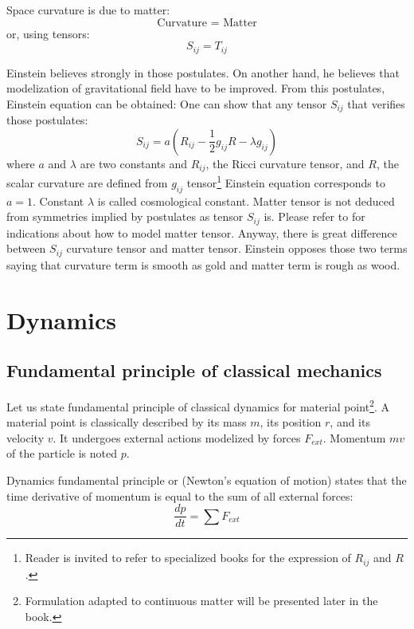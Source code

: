 \documentclass[12pt]{book}
\begin{document}
\begin{postulat}
Space curvature is due to matter:
\begin{equation}
\mbox{ Curvature }=\mbox{ Matter }
\end{equation}
or, using tensors:
\begin{equation}
S_{ij}=T_{ij}
\end{equation}
\end{postulat}
Einstein believes strongly in those postulates. On another hand, he believes
that modelization of gravitational field have to be improved.
From this postulates, Einstein equation can be obtained: One can show that any
tensor $S_{ij}$ that verifies those postulates:
\begin{equation}
S_{ij}=a(R_{ij}-\frac{1}{2}g_{ij}R-\lambda g_{ij})
\end{equation}
where $a$ and $\lambda$ are two constants and  $R_{ij}$, the Ricci
curvature tensor, and $R$, the scalar curvature are defined from $g_{ij}$
tensor\footnote{%
Reader is invited to refer to specialized books for the expression of
$R_{ij}$ and $R$.}%
Einstein equation corresponds to $a=1$. Constant $\lambda$ is called
cosmological constant. Matter tensor is not deduced from symmetries implied by
postulates as tensor $S_{ij}$ is. Please refer to
\cite{ph:relat:Misner73g} for indications about how to model
matter tensor. Anyway, there is great difference between $S_{ij}$ curvature
tensor and matter tensor. Einstein opposes those two terms saying that
curvature term is smooth as gold and matter term is rough as wood.
\section{Dynamics}
\subsection{Fundamental principle of classical mechanics}
Let us state fundamental principle of classical dynamics for material
point\footnote{%
Formulation adapted to continuous matter will be presented later in the book.
}.%
A material point is classically described by its mass $m$, its position $r$,
and its velocity $v$. 
It undergoes external actions modelized by forces $F_{ext}$. Momentum $mv$ of
the particle  is noted $p$.
\begin{prin}
Dynamics fundamental principle or (Newton's equation of motion)
 states that the time derivative of momentum is equal to the sum
of all external forces:
\begin{equation}
\frac{dp}{dt}=\sum F_{ext}
\end{equation}
\end{prin}
\end{document}
